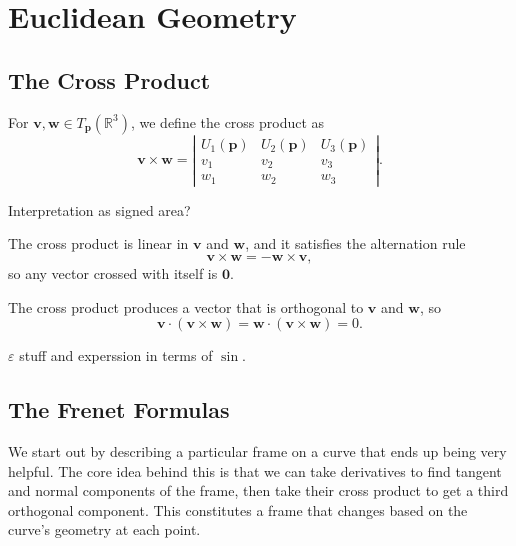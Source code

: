 \documentclass[10pt]{report}
\begin{document}

\chapter{Euclidean Geometry}


\section{The Cross Product}

For $\mathbf{v}, \mathbf{w} \in T_{\mathbf{p}}(\mathbb{R}^3)$, we define the cross product as
\[
\mathbf{v} \times \mathbf{w} = \left| 
\begin{matrix}
	U_1(\mathbf{p}) & U_2(\mathbf{p}) & U_3(\mathbf{p}) \\
	v_1 & v_2 & v_3 \\
	w_1 & w_2 & w_3
\end{matrix}\right|.
\] 

{\color{red}Interpretation as signed area?}

The cross product is linear in $\mathbf{v}$ and $\mathbf{w}$, and it satisfies the alternation rule
\[
\mathbf{v} \times \mathbf{w} = -\mathbf{w}\times \mathbf{v},
\] so any vector crossed with itself is $\mathbf{0}$.

The cross product produces a vector that is orthogonal to $\mathbf{v}$ and $\mathbf{w}$, so
\[
	\mathbf{v} \cdot (\mathbf{v}\times \mathbf{w}) = \mathbf{w}\cdot (\mathbf{v}\times \mathbf{w}) = 0.
\] 

{\color{red}$\varepsilon$ stuff and experssion in terms of $\sin$.}


\section{The Frenet Formulas}

We start out by describing a particular frame on a curve that ends up being very helpful. The core idea behind this is that we can take derivatives to find tangent and normal components of the frame, then take their cross product to get a third orthogonal component. This constitutes a frame that changes based on the curve's geometry at each point.
\end{document}
